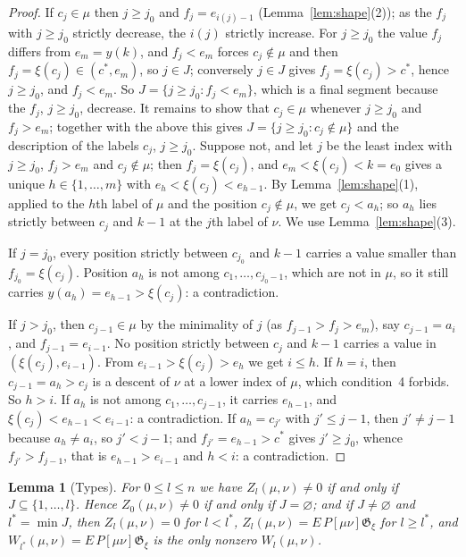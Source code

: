 \documentclass[11pt]{article}
\newtheorem{lemma}[proposition]{Lemma}
\newcommand{\G}{\mathfrak{G}}
\begin{document}
\begin{proof}
If $c_j\in\mu$ then $j\geq j_0$ and $f_j=e_{i(j)-1}$
(Lemma~\ref{lem:shape}(2)); as the $f_j$ with $j\geq j_0$ strictly
decrease, the $i(j)$ strictly increase. For $j\geq j_0$ the value
$f_j$ differs from $e_m=y(k)$, and $f_j<e_m$ forces $c_j\notin\mu$ and
then $f_j=\xi(c_j)\in(c^\ast,e_m)$, so $j\in J$; conversely $j\in J$
gives $f_j=\xi(c_j)>c^\ast$, hence $j\geq j_0$, and $f_j<e_m$. So
$J=\{j\geq j_0:f_j<e_m\}$, which is a final segment because the $f_j$,
$j\geq j_0$, decrease. It remains to show that $c_j\in\mu$ whenever
$j\geq j_0$ and $f_j>e_m$; together with the above this gives
$J=\{j\geq j_0:c_j\notin\mu\}$ and the description of the labels
$c_j$, $j\geq j_0$. Suppose not, and let $j$ be the least index
with $j\geq j_0$, $f_j>e_m$ and $c_j\notin\mu$; then $f_j=\xi(c_j)$,
and $e_m<\xi(c_j)<k=e_0$ gives a unique $h\in\{1,\ldots,m\}$ with
$e_h<\xi(c_j)<e_{h-1}$. By Lemma~\ref{lem:shape}(1), applied to the
$h$th label of $\mu$ and the position $c_j\notin\mu$, we get
$c_j<a_h$; so $a_h$ lies strictly between $c_j$ and $k-1$ at the $j$th
label of $\nu$. We use Lemma~\ref{lem:shape}(3).

If $j=j_0$, every position strictly between $c_{j_0}$ and $k-1$
carries a value smaller than $f_{j_0}=\xi(c_j)$. Position $a_h$ is not
among $c_1,\ldots,c_{j_0-1}$, which are not in $\mu$, so it still
carries $y(a_h)=e_{h-1}>\xi(c_j)$: a contradiction.

If $j>j_0$, then $c_{j-1}\in\mu$ by the minimality of $j$ (as
$f_{j-1}>f_j>e_m$), say $c_{j-1}=a_i$, and $f_{j-1}=e_{i-1}$. No
position strictly between $c_j$ and $k-1$ carries a value in
$(\xi(c_j),e_{i-1})$. From $e_{i-1}>\xi(c_j)>e_h$ we get $i\leq h$. If
$h=i$, then $c_{j-1}=a_h>c_j$ is a descent of $\nu$ at a lower index
of $\mu$, which condition~4 forbids. So $h>i$. If $a_h$ is not among
$c_1,\ldots,c_{j-1}$, it carries $e_{h-1}$, and
$\xi(c_j)<e_{h-1}<e_{i-1}$: a contradiction. If $a_h=c_{j'}$ with
$j'\leq j-1$, then $j'\neq j-1$ because $a_h\neq a_i$, so $j'<j-1$;
and $f_{j'}=e_{h-1}>c^\ast$ gives $j'\geq j_0$, whence
$f_{j'}>f_{j-1}$, that is $e_{h-1}>e_{i-1}$ and $h<i$: a contradiction.
\end{proof}

\begin{lemma}[Types]\label{lem:types}
For $0\leq l\leq n$ we have $Z_l(\mu,\nu)\neq0$ if and only if
$J\subseteq\{1,\ldots,l\}$. Hence $Z_0(\mu,\nu)\neq0$ if and only if
$J=\varnothing$; and if $J\neq\varnothing$ and $l^\ast=\min J$, then
$Z_l(\mu,\nu)=0$ for $l<l^\ast$, $Z_l(\mu,\nu)=E\,P[\mu\nu]\G_\xi$ for
$l\geq l^\ast$, and $W_{l^\ast}(\mu,\nu)=E\,P[\mu\nu]\G_\xi$ is the only
nonzero $W_l(\mu,\nu)$.
\end{lemma}
\end{document}
